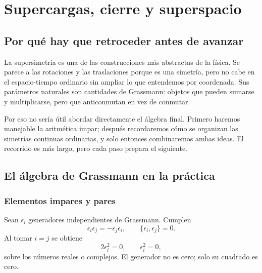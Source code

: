 \chapter{Supercargas, cierre y superspacio}


\section{Por qué hay que retroceder antes de avanzar}

La supersimetría es una de las construcciones más abstractas de la física. Se parece a las rotaciones y las traslaciones porque es una simetría, pero no cabe en el espacio-tiempo ordinario sin ampliar lo que entendemos por coordenada. Sus parámetros naturales son cantidades de Grassmann: objetos que pueden sumarse y multiplicarse, pero que anticonmutan en vez de conmutar.

Por eso no sería útil abordar directamente el álgebra final. Primero haremos manejable la aritmética impar; después recordaremos cómo se organizan las simetrías continuas ordinarias, y solo entonces combinaremos ambas ideas. El recorrido es más largo, pero cada paso prepara el siguiente.

\section{El álgebra de Grassmann en la práctica}

\subsection{Elementos impares y pares}

Sean \(\epsilon_i\) generadores independientes de Grassmann. Cumplen
\begin{equation}
\epsilon_i\epsilon_j=-\epsilon_j\epsilon_i,
\qquad
\{\epsilon_i,\epsilon_j\}=0.
\end{equation}
Al tomar \(i=j\) se obtiene
\begin{equation}
2\epsilon_i^2=0,
\qquad
\epsilon_i^2=0,
\end{equation}
sobre los números reales o complejos. El generador no es cero; solo su cuadrado es cero.

